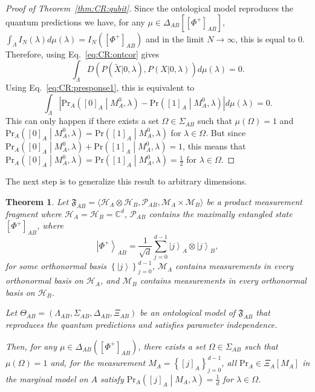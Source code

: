 \documentclass[DIV=calc,paper=a4,fontsize=11pt,twocolumn]{scrartcl} %
\theoremstyle{definition}
\theoremstyle{plain}
\newtheorem{theorem}[definition]{Theorem}
\newcommand{\Ket}[1]{\ensuremath{\left \vert #1 \right \rangle}}
\newcommand{\Proj}[1]{\ensuremath{\left [ #1 \right ]}}
\newcommand{\Hilb}[1][]{\ensuremath{\mathcal{H}_{#1}}}
\begin{document}
\begin{proof}[Proof of Theorem~\ref{thm:CR:qubit}]
Since the ontological model reproduces the quantum predictions we
have, for any $\mu \in \Delta_{AB} \left [ \Proj{\Phi^+}_{AB} \right
]$, $\int_{\Lambda} I_N(\lambda) d\mu(\lambda) = I_N \left (
\Proj{\Phi^+}_{AB} \right )$ and in the limit $N \rightarrow
\infty$, this is equal to $0$.  Therefore, using
Eq.~\eqref{eq:CR:ontcor} gives
\begin{equation}
\int_{\Lambda}
D(P(\tilde{X}|0,\lambda),P(X|0,\lambda))d\mu(\lambda) = 0.
\end{equation}
Using Eq.~\eqref{eq:CR:presponse1}, this is equivalent to
\begin{equation}
\int_{\Lambda}\left | \text{Pr}_A \left ( \Proj{0}_A \middle |
M^0_A, \lambda \right ) -
\text{Pr} \left ( \Proj{1}_A \middle | M^0_A, \lambda \right )
\right |d\mu(\lambda) = 0.
\end{equation}
This can only happen if there exists a set $\Omega \in \Sigma_{AB}$
such that $\mu(\Omega) = 1$ and $\text{Pr}_A \left ( \Proj{0}_A
\middle | M^0_A, \lambda \right ) = \text{Pr} \left ( \Proj{1}_A
\middle | M^0_A, \lambda \right )$ for $\lambda \in \Omega$.  But
since $\text{Pr}_A \left ( \Proj{0}_A \middle | M^0_A, \lambda
\right ) + \text{Pr} \left ( \Proj{1}_A \middle | M^0_A, \lambda
\right ) = 1$, this means that $\text{Pr}_A \left ( \Proj{0}_A
\middle | M^0_A, \lambda \right ) = \text{Pr} \left ( \Proj{1}_A
\middle | M^0_A, \lambda \right ) = \frac{1}{2}$ for $\lambda \in
\Omega$.
\end{proof}

The next step is to generalize this result to arbitrary dimensions.

\begin{theorem}
\label{thm:CR:qudit}
Let $\mathfrak{F}_{AB} = \langle \Hilb[A] \otimes \Hilb[B],
\mathcal{P}_{AB}, \mathcal{M}_A \times \mathcal{M}_B \rangle$ be a
product measurement fragment where $\Hilb[A] = \Hilb[B] =
\mathbb{C}^d$, $\mathcal{P}_{AB}$ contains the maximally entangled
state $\Proj{\Phi^+}_{AB}$, where
\begin{equation}
\Ket{\Phi^+}_{AB} = \frac{1}{\sqrt{d}} \sum_{j=0}^{d-1} \Ket{j}_A
\otimes \Ket{j}_B,
\end{equation}
for some orthonormal basis $\left \{ \Ket{j} \right \}_{j=0}^{d-1}$,
$\mathcal{M}_A$ contains measurements in every orthonormal basis on
$\Hilb[A]$, and $\mathcal{M}_B$ contains measurements in every
orthonormal basis on $\Hilb[B]$.

Let $\Theta_{AB} = (\Lambda_{AB}, \Sigma_{AB}, \Delta_{AB}, \Xi_{AB})$
be an ontological model of $\mathfrak{F}_{AB}$ that reproduces the
quantum predictions and satisfies parameter independence.

Then, for any $\mu \in \Delta_{AB} \left (\Proj{\Phi^+}_{AB} \right
)$, there exists a set $\Omega \in \Sigma_{AB}$ such that
$\mu(\Omega) = 1$ and, for the measurement $M_A = \left \{\Proj{j}_A
\right \}_{j=0}^{d-1}$, all $\mathrm{Pr}_A \in \Xi_A[M_A]$ in the
marginal model on $A$ satisfy $\mathrm{Pr}_A \left (\Proj{j}_A \middle
| M_A, \lambda \right ) = \frac{1}{d}$ for $\lambda \in \Omega$.
\end{theorem}
\end{document}
